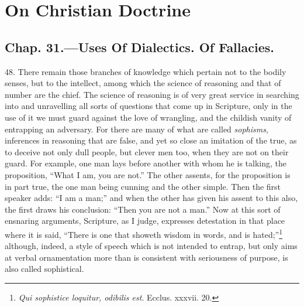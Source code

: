 
\author{Augustine of Hippo}
\chapter[On Christian Doctrine, bk 2.31--2.34]{On Christian
Doctrine}

\section*{Chap. 31.\smaller---Uses Of Dialectics. Of
Fallacies.}

48. There remain those branches of knowledge which pertain not to the
bodily senses, but to the intellect, among which the science of
reasoning and that of number are the chief. The science of reasoning
is of very great service in searching into and unravelling all sorts
of questions that come up in Scripture, only in the use of it we must
guard against the love of wrangling, and the childish vanity of
entrapping an adversary. For there are many of what are called
\textit{sophisms}, inferences in reasoning that are false, and yet so
close an imitation of the true, as to deceive not only dull people,
but clever men too, when they are not on their guard. For example, one
man lays before another with whom he is talking, the proposition,
``What I am, you are not.'' The other assents, for the proposition is
in part true, the one man being cunning and the other simple. Then the
first speaker adds: ``I am a man;'' and when the other has given his
assent to this also, the first draws his conclusion: ``Then you are
not a man.'' Now at this sort of ensnaring arguments, Scripture, as I
judge, expresses detestation in that place where it is said, ``There
is one that showeth wisdom in words, and is
hated;''\footnote{\textit{Qui sophistice loquitur, odibilis est}.
Ecclus. xxxvii. 20.} although, indeed, a style of speech which is not
intended to entrap, but  only aims at verbal ornamentation
more than is consistent with seriousness of purpose, is also called
sophistical.

